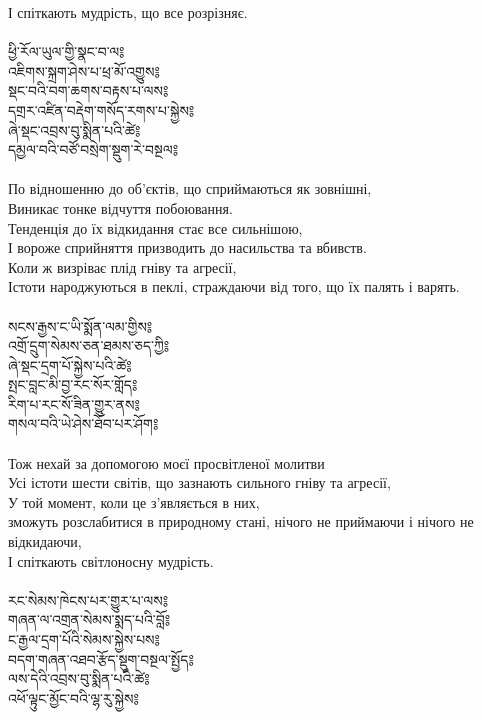 І спіткають мудрість, що все розрізняє. \\
\\
\newpage
{\ti
ཕྱི་རོལ་ཡུལ་གྱི་སྣང་བ་ལ༔ \\
འཇིགས་སྐྲག་ཤེས་པ་ཕྲ་མོ་འགྱུས༔ \\
སྡང་བའི་བག་ཆགས་བརྟས་པ་ལས༔ \\
དགྲར་འཛིན་བརྡེག་གསོད་རགས་པ་སྐྱེས༔ \\
ཞེ་སྡང་འབྲས་བུ་སྨིན་པའི་ཚེ༔ \\
དམྱལ་བའི་བཙོ་བསྲེག་སྡུག་རེ་བསྔལ༔}\\
\\
По відношенню до об'єктів, що сприймаються як зовнішні, \\
Виникає тонке відчуття побоювання. \\
Тенденція до їх відкидання стає все сильнішою, \\
І вороже сприйняття призводить до насильства та вбивств. \\
Коли ж визріває плід гніву та агресії, \\
Істоти народжуються в пеклі, страждаючи від того, що їх палять і варять. \\
\\
{\ti
སངས་རྒྱས་ང་ཡི་སྨོན་ལམ་གྱིས༔ \\
འགྲོ་དྲུག་སེམས་ཅན་ཐམས་ཅད་ཀྱི༔ \\
ཞེ་སྡང་དྲག་པོ་སྐྱེས་པའི་ཚེ༔ \\
སྤང་བླང་མི་བྱ་རང་སོར་གློད༔ \\
རིག་པ་རང་སོ་ཟིན་གྱུར་ནས༔ \\
གསལ་བའི་ཡེ་ཤེས་ཐོབ་པར་ཤོག༔}\\
\\
Тож нехай за допомогою моєї просвітленої молитви \\
Усі істоти шести світів, що зазнають сильного гніву та агресії, \\
У той момент, коли це з'являється в них, \\
зможуть розслабитися в природному стані, нічого не приймаючи і нічого не відкидаючи, \\
І спіткають світлоносну мудрість. \\
\\
\newpage
{\ti
རང་སེམས་ཁེངས་པར་གྱུར་པ་ལས༔ \\
གཞན་ལ་འགྲན་སེམས་སྨད་པའི་བློ༔ \\
ང་རྒྱལ་དྲག་པོའི་སེམས་སྐྱེས་པས༔ \\
བདག་གཞན་འཐབ་རྩོད་སྡུག་བསྔལ་སྤྱོད༔ \\
ལས་དེའི་འབྲས་བུ་སྨིན་པའི་ཚེ༔ \\
འཕོ་ལྟུང་མྱོང་བའི་ལྷ་རུ་སྐྱེས༔}\\
